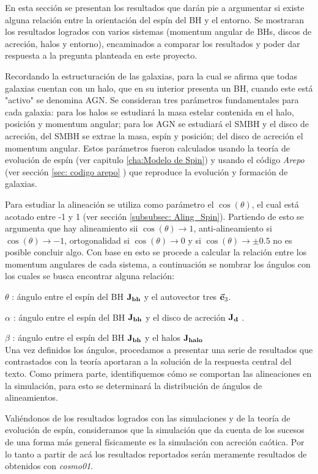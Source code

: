 En esta sección se presentan los resultados que darán pie a argumentar si existe alguna relación entre la orientación del espín del BH y el entorno. Se mostraran los resultados logrados con varios sistemas (momentum angular de BHs, discos de acreción, halos y entorno), encaminados a comparar los resultados y poder dar respuesta a la pregunta planteada en este proyecto. 

Recordando la estructuración de las galaxias, para la cual se afirma que todas galaxias cuentan con un halo, que en su interior presenta un BH, cuando este está "activo" se denomina AGN. Se consideran tres parámetros fundamentales para cada galaxia: para los halos se estudiará la masa estelar contenida en el halo, posición y momentum angular; para los AGN se estudiará el SMBH y el disco de acreción, del SMBH se extrae la masa, espín y posición; del disco de acreción el momentum angular. Estos parámetros fueron calculados usando la teoría de evolución de espín (ver capitulo \ref{cha:Modelo de Spin}) y usando el código {\it{Arepo}} (ver sección \ref{sec: codigo arepo} ) que reproduce la evolución y formación de galaxias. 

Para estudiar la alineación se utiliza como parámetro el $\cos (\theta)$, el cual está acotado entre -1 y 1 (ver sección \ref{subsubsec: Aling_Spin}). Partiendo de esto se argumenta que hay alineamiento sii  $\cos (\theta) \to 1$, anti-alineamiento si $\cos (\theta)\to -1$, ortogonalidad si $\cos (\theta)\to 0$ y si $\cos (\theta)\to \pm 0.5 $ no es posible concluir algo. Con base en esto se procede a calcular la relación entre los momentum angulares de cada sistema, a continuación se nombrar los ángulos con los cuales se busca encontrar alguna relación:

$\theta$ : ángulo entre el espín del BH ${\bf{J_{bh}}}$ y el autovector tres $\vec{\bf{e}}_{3}$.

$\alpha$ : ángulo entre el espín del BH ${\bf{J_{bh}}}$  y el disco de acreción ${\bf{J_{d}}}$ .

$\beta$ :  ángulo entre el espín del BH ${\bf{J_{bh}}}$ y el halos ${\bf{J_{halo}}}$\\

Una vez definidos los ángulos, procedamos a presentar una serie de resultados que contrastados con la teoría aportaran a la solución de la respuesta central del texto. Como primera parte, identifiquemos cómo se comportan las alineaciones en la simulación, para esto se determinará la distribución de ángulos de alineamientos. 

Valiéndonos de los resultados logrados con las simulaciones y de la teoría de evolución de espín, consideramos que la simulación que da cuenta de los sucesos de una forma más general físicamente es la simulación con acreción caótica. Por lo tanto a partir de acá los resultados reportados serán meramente resultados de obtenidos con {\it{cosmo01}}. 

